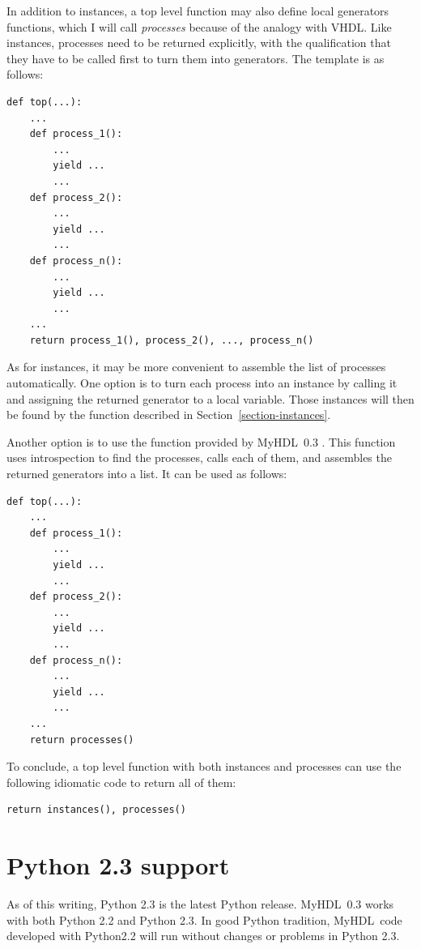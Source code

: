 \documentclass{howto}
\newcommand{\myhdl}{\protect \mbox{MyHDL}}
\begin{document}
In addition to instances, a top level function may
also define local generators functions, which I will
call \emph{processes} because of the analogy with VHDL.
Like instances, processes need to be returned explicitly,
with the qualification that they have to be called first
to turn them into generators. The template is as follows:

\begin{verbatim}
def top(...):
    ...
    def process_1():
        ...
        yield ...
        ...
    def process_2():
        ...
        yield ...
        ...
    def process_n():
        ...
        yield ...
        ...
    ...
    return process_1(), process_2(), ..., process_n()
\end{verbatim}

As for instances, it may be more convenient to assemble the list of
processes automatically. One option is to turn each process into an
instance by calling it and assigning the returned generator to a
local variable. Those instances will then be found by the
 function described in
Section~\ref{section-instances}.

Another option is to use the function  provided
by \myhdl\ 0.3 . This function uses introspection to find the
processes, calls each of them, and assembles the returned generators
into a list. It can be used as follows:

\begin{verbatim}
def top(...):
    ...
    def process_1():
        ...
        yield ...
        ...
    def process_2():
        ...
        yield ...
        ...
    def process_n():
        ...
        yield ...
        ...
    ... 
    return processes()
\end{verbatim}

To conclude, a top level function with both instances and
processes can use the following idiomatic code to
return all of them:

\begin{verbatim}
return instances(), processes()
\end{verbatim}


\section{Python 2.3 support\label{section-Python}}

As of this writing, Python 2.3 is the latest Python release.  \myhdl\
0.3 works with both Python 2.2 and Python 2.3. In good Python
tradition, \myhdl\ code developed with Python2.2 will run without
changes or problems in Python 2.3.
\end{document}
